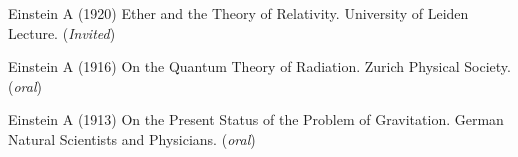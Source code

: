 \item Einstein A (1920) Ether and the Theory of Relativity. University of Leiden Lecture. (\textit{Invited})
\item Einstein A (1916) On the Quantum Theory of Radiation. Zurich Physical Society. (\textit{oral})
\item Einstein A (1913) On the Present Status of the Problem of Gravitation. German Natural Scientists and Physicians. (\textit{oral})
